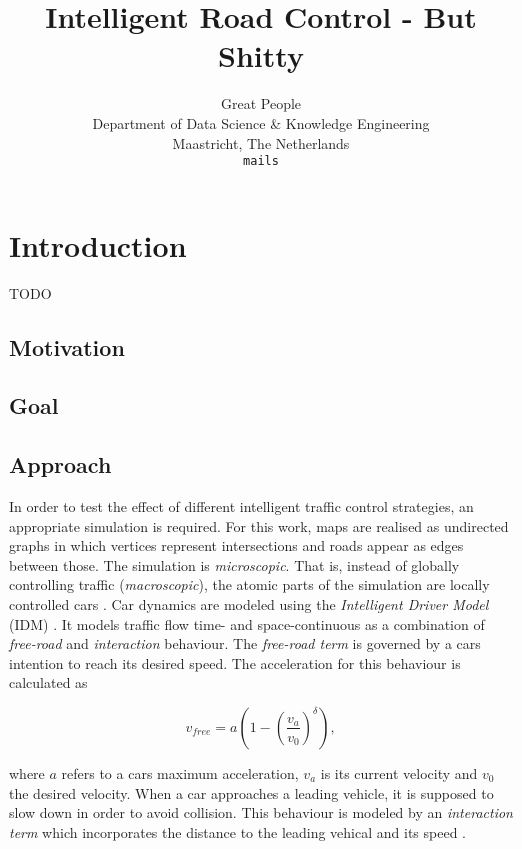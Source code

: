 \documentclass[10pt]{article}
\title{Intelligent Road Control - But Shitty}
\author{Great People \\
	Department of Data Science \& Knowledge Engineering\\
	Maastricht, The Netherlands\\
	{\tt mails}
  }
\begin{document}
\maketitle

\begin{abstract}
	
\end{abstract}

\section{Introduction}
TODO

\subsection{Motivation}

\subsection{Goal}

\subsection{Approach}
In order to test the effect of different intelligent traffic control strategies, an appropriate simulation is required. For this work, maps are realised as undirected graphs in which vertices represent intersections and roads appear as edges between those. The simulation is \textit{microscopic}. That is, instead of globally controlling traffic (\textit{macroscopic}), the atomic parts of the simulation are locally controlled cars \citep[see also][]{krajzewicz2002sumo}. Car dynamics are modeled using the \textit{Intelligent Driver Model} (IDM) \citep{treiber2000congested}. It models traffic flow time- and space-continuous as a combination of \textit{free-road} and \textit{interaction} behaviour. The \textit{free-road term} is governed by a cars intention to reach its desired speed. The acceleration for this behaviour is calculated \citep{treiber2000congested} as

\begin{equation}
	v_{free} = a ( 1 - ( \frac{v_a}{v_0} )^\delta),
\end{equation}

where $a$ refers to a cars maximum acceleration, $v_a$ is its current velocity and $v_0$ the desired velocity. When a car approaches a leading vehicle, it is supposed to slow down in order to avoid collision. This behaviour is modeled by an \textit{interaction term} which incorporates the distance to the leading vehical and its speed \citep{treiber2000congested}. 
\end{document}
